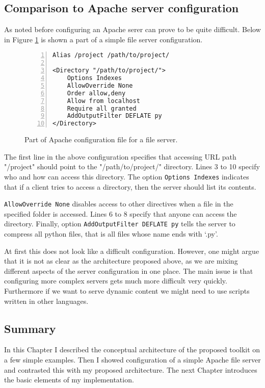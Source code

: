 \subsection{Comparison to Apache server configuration}
As noted before configuring an Apache serer can prove to be quite difficult.
Below in Figure \ref{fig:apache} is shown a part of a simple file server
configuration.
\begin{figure}[h]
\centering
\begin{lstlisting}[numbers=left]
Alias /project /path/to/project/

<Directory "/path/to/project/">
    Options Indexes
    AllowOverride None
    Order allow,deny
    Allow from localhost
    Require all granted
    AddOutputFilter DEFLATE py
</Directory>
\end{lstlisting}
\caption[scale=1.0]{Part of Apache configuration file for a file server.}
\label{fig:apache}
\end{figure}

The first line in the above configuration specifies that accessing URL 
path "/project" should point to the "/path/to/project/" directory.
Lines 3 to 10 specify who and how can access this directory.
The option \texttt{Options Indexes} indicates that if a client tries
to access a directory, then the server should list its contents.

\texttt{AllowOverride None} disables access to other directives when 
a file in the specified folder is accessed. Lines 6 to 8 specify that
anyone can access the directory. Finally, option 
\texttt{AddOutputFilter DEFLATE py} tells the server to compress
all python files, that is all files whose name ends with `.py'.

At first this does not look like a difficult configuration. However, 
one might argue that it is not as clear as the architecture proposed above,
as we are mixing different aspects of the server configuration in one place.
The main issue is that configuring more complex servers gets much more 
difficult very quickly. Furthermore if we want to serve dynamic content
we might need to use scripts written in other languages.

\subsection{Summary}
In this Chapter I described the conceptual architecture of the proposed
toolkit on a few simple examples. Then I showed configuration of a simple
Apache file server and contrasted this with my proposed architecture.
The next Chapter introduces the basic elements of my implementation.
